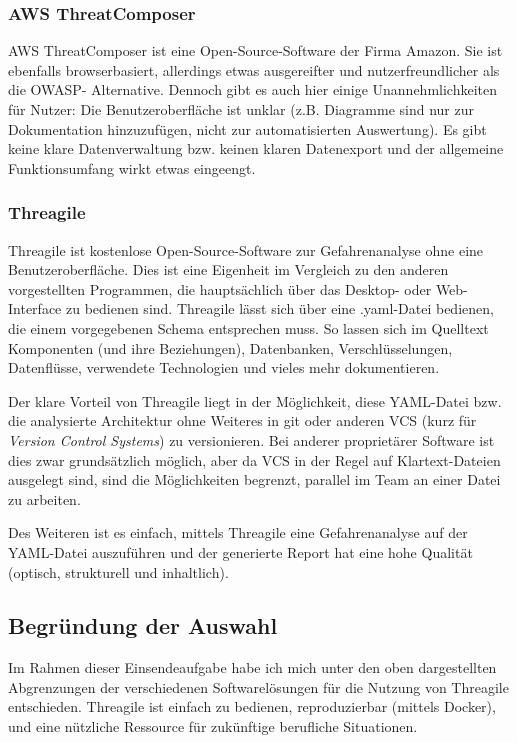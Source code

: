 \documentclass{article}
\begin{document}
\subsubsection*{AWS ThreatComposer}

AWS ThreatComposer ist eine Open-Source-Software der Firma Amazon. Sie ist ebenfalls 
browserbasiert, allerdings etwas ausgereifter und nutzerfreundlicher als die OWASP-
Alternative. Dennoch gibt es auch hier einige Unannehmlichkeiten für Nutzer: Die 
Benutzeroberfläche ist unklar (z.B. Diagramme sind nur zur Dokumentation hinzuzufügen, 
nicht zur automatisierten Auswertung). Es gibt keine klare Datenverwaltung bzw. keinen 
klaren Datenexport und der allgemeine Funktionsumfang wirkt etwas eingeengt.

\subsubsection*{Threagile}

Threagile ist kostenlose Open-Source-Software zur Gefahrenanalyse ohne eine 
Benutzeroberfläche. Dies ist eine Eigenheit im Vergleich zu den anderen vorgestellten 
Programmen, die hauptsächlich über das Desktop- oder Web-Interface zu bedienen sind. 
Threagile lässt sich über eine .yaml-Datei bedienen, die einem vorgegebenen Schema 
entsprechen muss. So lassen sich im Quelltext Komponenten (und ihre Beziehungen), 
Datenbanken, Verschlüsselungen, Datenflüsse, verwendete Technologien und vieles mehr 
dokumentieren.

Der klare Vorteil von Threagile liegt in der Möglichkeit, diese YAML-Datei bzw. die 
analysierte Architektur ohne Weiteres in git oder anderen VCS (kurz für \textit{Version 
Control Systems}) zu versionieren. Bei anderer proprietärer Software ist dies zwar 
grundsätzlich möglich, aber da VCS in der Regel auf Klartext-Dateien ausgelegt sind, sind 
die Möglichkeiten begrenzt, parallel im Team an einer Datei zu arbeiten.

Des Weiteren ist es einfach, mittels Threagile eine Gefahrenanalyse auf der YAML-Datei 
auszuführen und der generierte Report hat eine hohe Qualität (optisch, strukturell und 
inhaltlich).

\subsection{Begründung der Auswahl}

Im Rahmen dieser Einsendeaufgabe habe ich mich unter den oben dargestellten Abgrenzungen 
der verschiedenen Softwarelösungen für die Nutzung von Threagile entschieden. Threagile 
ist einfach zu bedienen, reproduzierbar (mittels Docker), und eine nützliche Ressource für 
zukünftige berufliche Situationen.
\end{document}
